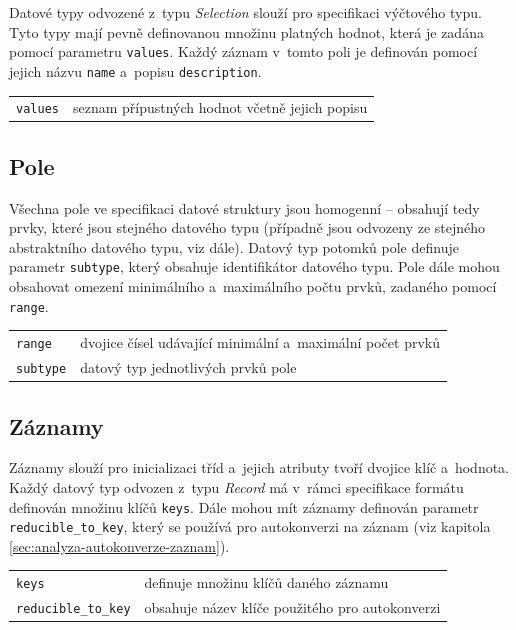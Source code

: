 \documentclass[FM,bw,DP]{tulthesis}
\begin{document}
Datové typy odvozené z~typu \textit{Selection} slouží pro specifikaci výčtového typu. Tyto typy mají pevně definovanou množinu platných hodnot, která je zadána pomocí parametru \texttt{values}. Každý záznam v~tomto poli je definován pomocí jejich názvu \texttt{name} a~popisu \texttt{description}.


\vspace{0.5cm}
\begin{tabular}{m{3cm}@{}l}
\texttt{values}\dotfill & seznam přípustných hodnot včetně jejich popisu \\
\end{tabular}

\subsection{Pole}

Všechna pole ve specifikaci datové struktury jsou homogenní -- obsahují tedy prvky, které jsou stejného datového typu (případně jsou odvozeny ze stejného abstraktního datového typu, viz dále). Datový typ potomků pole definuje parametr \texttt{subtype}, který obsahuje identifikátor datového typu. Pole dále mohou obsahovat omezení minimálního a~maximálního počtu prvků, zadaného pomocí \texttt{range}.

\vspace{0.5cm}
\begin{tabular}{m{3cm}@{}l}
\texttt{range}\dotfill & dvojice čísel udávající minimální a~maximální počet prvků \\
\texttt{subtype}\dotfill & datový typ jednotlivých prvků pole \\
\end{tabular}

\subsection{Záznamy}

Záznamy slouží pro inicializaci tříd a~jejich atributy tvoří dvojice klíč a~hodnota. Každý datový typ odvozen z~typu \textit{Record} má v~rámci specifikace formátu definován množinu klíčů \texttt{keys}. Dále mohou mít záznamy definován parametr \texttt{reducible\_to\_key}, který se používá pro autokonverzi na záznam (viz kapitola \ref{sec:analyza-autokonverze-zaznam}).

\vspace{0.5cm}
\begin{tabular}{m{4cm}@{}l}
\texttt{keys}\dotfill & definuje množinu klíčů daného záznamu \\
\texttt{reducible\_to\_key}\dotfill & obsahuje název klíče použitého pro autokonverzi \\
\end{tabular}
\vspace{0.5cm}
\end{document}
